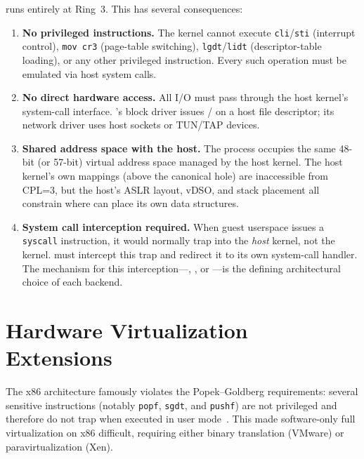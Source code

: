 \UML{} runs entirely at Ring~3.  This has several consequences:

\begin{enumerate}
  \item \textbf{No privileged instructions.}
        The \UML{} kernel cannot execute \texttt{cli}/\texttt{sti}
        (interrupt control), \texttt{mov~cr3} (page-table switching),
        \texttt{lgdt}/\texttt{lidt} (descriptor-table loading), or
        any other privileged instruction.  Every such operation must
        be emulated via host system calls.

  \item \textbf{No direct hardware access.}
        All I/O must pass through the host kernel's system-call
        interface.  \UML{}'s block driver issues /
        on a host file descriptor; its network driver uses host sockets
        or TUN/TAP devices.

  \item \textbf{Shared address space with the host.}
        The \UML{} process occupies the same 48-bit (or 57-bit) virtual
        address space managed by the host kernel.  The host kernel's
        own mappings (above the canonical hole) are inaccessible from
        CPL=3, but the host's ASLR layout, vDSO, and stack placement
        all constrain where \UML{} can place its own data structures.

  \item \textbf{System call interception required.}
        When guest userspace issues a \texttt{syscall} instruction, it
        would normally trap into the \emph{host} kernel, not the
        \UML{} kernel.  \UML{} must intercept this trap and redirect
        it to its own system-call handler.  The mechanism for this
        interception---, \Seccomp{}, or \KVM{}---is
        the defining architectural choice of each \UML{} backend.
\end{enumerate}


\section{Hardware Virtualization Extensions}
\label{sec:foundations:hwvirt}

The x86 architecture famously violates the Popek--Goldberg
requirements: several sensitive instructions (notably \texttt{popf},
\texttt{sgdt}, and \texttt{pushf}) are not privileged and therefore
do not trap when executed in user mode~\cite{adams2006}.  This made
software-only full virtualization on x86 difficult, requiring either
binary translation (VMware) or paravirtualization (Xen).

